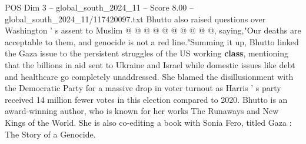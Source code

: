 \begin{textsample}{POS Dim 3 – global\_south\_2024\_11 – Score 8.00 – global\_south\_2024\_11/117420097.txt}
Bhutto also raised questions over Washington ' s assent to Muslim @ @ @ @ @ @ @ @ @ @, saying,"Our deaths are acceptable to them, and genocide is not a red line."Summing it up, Bhutto linked the Gaza issue to the persistent struggles of the US working \textbf{class}, mentioning that the billions in aid sent to Ukraine and Israel while domestic issues like debt and healthcare go completely unaddressed.
She blamed the disillusionment with the Democratic Party for a massive drop in voter turnout as Harris ' s party received 14 million fewer votes in this election compared to 2020.
Bhutto is an award-winning author, who is known for her works The Runaways and New Kings of the World.
She is also co-editing a book with Sonia Fero, titled Gaza : The Story of a Genocide.

\end{textsample}
